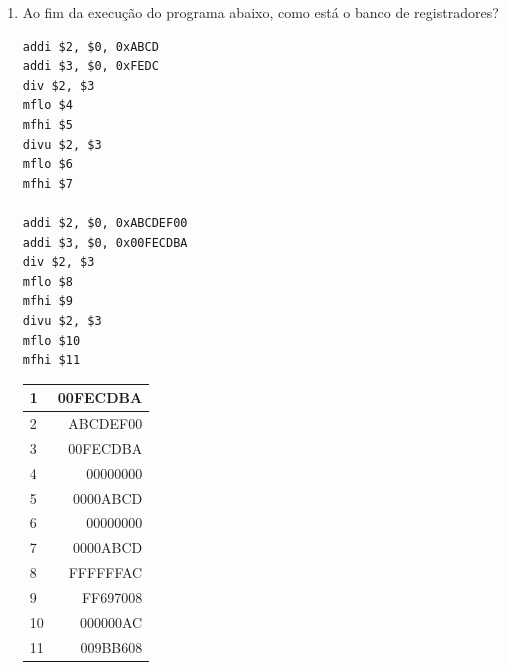 \documentclass{article}
\begin{document}
\begin{enumerate}
\pagebreak

\item Ao fim da execução do programa abaixo, como está o banco de registradores?

\begin{center}
    \begin{minipage}{0.45\textwidth}
        \begin{lstlisting}[frame=single]
addi $2, $0, 0xABCD
addi $3, $0, 0xFEDC
div $2, $3
mflo $4
mfhi $5
divu $2, $3
mflo $6
mfhi $7 

addi $2, $0, 0xABCDEF00
addi $3, $0, 0x00FECDBA
div $2, $3
mflo $8
mfhi $9
divu $2, $3
mflo $10
mfhi $11
        \end{lstlisting}

\begin{table}[H]
    \begin{tabular}{|l|r|}
    \hline
    1  & 00FECDBA \\ \hline
    2  & ABCDEF00 \\ \hline
    3  & 00FECDBA \\ \hline
    4  & 00000000 \\ \hline
    5  & 0000ABCD \\ \hline
    6  & 00000000 \\ \hline
    7  & 0000ABCD \\ \hline
    8  & FFFFFFAC \\ \hline
    9  & FF697008 \\ \hline
    10 & 000000AC \\ \hline
    11 & 009BB608 \\ \hline
    \end{tabular}
\end{table}
\end{minipage}
\end{center}


\end{enumerate}
\end{document}
